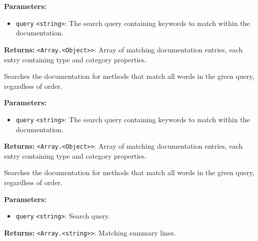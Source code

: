 \documentclass[12pt,a4paper]{article}
\begin{document}
\vspace{5mm}
\noindent {}


\noindent \textbf{Parameters:}
\begin{itemize}
  \item \texttt{query} \texttt{<string>}: The search query containing keywords to match within the documentation.
\end{itemize}

\noindent \textbf{Returns:} \texttt{<Array.<Object>>}: Array of matching documentation entries, each entry containing \textasciigrave{}type\textasciigrave{} and \textasciigrave{}category\textasciigrave{} properties.

\noindent Searches the documentation for methods that match all words in the given query, regardless of order.

\vspace{5mm}
\noindent {}


\noindent \textbf{Parameters:}
\begin{itemize}
  \item \texttt{query} \texttt{<string>}: The search query containing keywords to match within the documentation.
\end{itemize}

\noindent \textbf{Returns:} \texttt{<Array.<Object>>}: Array of matching documentation entries, each entry containing \textasciigrave{}type\textasciigrave{} and \textasciigrave{}category\textasciigrave{} properties.

\noindent Searches the documentation for methods that match all words in the given query, regardless of order.

\vspace{5mm}
\noindent {}


\noindent \textbf{Parameters:}
\begin{itemize}
  \item \texttt{query} \texttt{<string>}: Search query.
\end{itemize}

\noindent \textbf{Returns:} \texttt{<Array.<string>>}: Matching summary lines.
\end{document}
